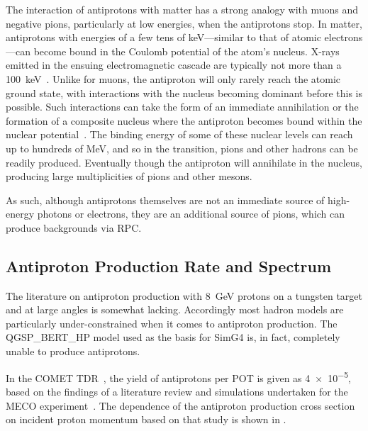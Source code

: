 %
The interaction of antiprotons with matter has a strong analogy with muons and negative pions, particularly at low energies, when the antiprotons stop.
In matter, antiprotons with energies of a few tens of keV---similar to that of atomic electrons---can become bound in the Coulomb potential of the atom's nucleus.
X-rays emitted in the ensuing electromagnetic cascade are typically not more than a 100~keV~\cite{Aramaki201352}.
Unlike for muons, the antiproton will only rarely reach the atomic ground state, with interactions with the nucleus becoming dominant before this is possible.
Such interactions can take the form of an immediate annihilation or the formation of a composite nucleus where the antiproton becomes bound within the nuclear potential~\cite{Wong:1984fy,Mishustin:2004xa}.
The binding energy of some of these nuclear levels can reach up to hundreds of MeV, and so in the transition, pions and other hadrons can be readily produced.
Eventually though the antiproton will annihilate in the nucleus, producing large multiplicities of pions and other mesons.

As such, although antiprotons themselves are not an immediate source of high-energy photons or electrons, they are an additional source of pions, which can produce backgrounds via \acf{RPC}.

\subsection{Antiproton Production Rate and Spectrum}
The literature on antiproton production with 8~GeV protons on a tungsten target and at large angles is somewhat lacking.
Accordingly most hadron models are particularly under-constrained when it comes to antiproton production.
The QGSP_BERT_HP model used as the basis for SimG4 is, in fact, completely unable to produce antiprotons.

\FigAntiprotonMeco
In the COMET TDR~\cite{TDR2016}, the yield of antiprotons per \ac{POT} is given as \num{4e-5}, based on the findings of a literature review and simulations undertaken for the MECO experiment~\cite{Meco024}.
The dependence of the antiproton production cross section on incident proton momentum based on that study is shown in .

